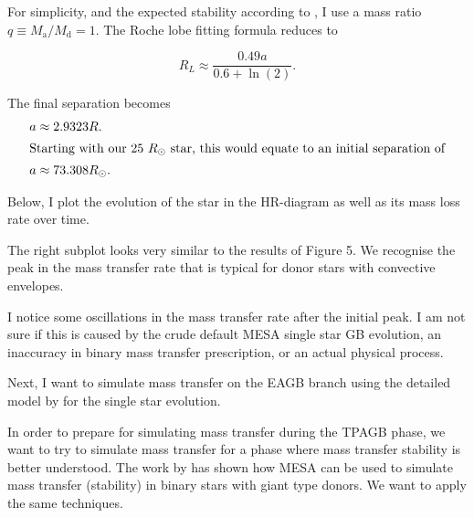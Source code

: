 \documentclass[a4paper,10pt]{article}
\begin{document}
    For simplicity, and the expected stability according to \citet{temmink2022}, I use a mass ratio \(q \equiv M _\text{a} / M _\text{d} = 1\). The Roche lobe fitting formula reduces to
    
    \begin{equation*}
        R_{L} \approx  \frac{0.49 a}{0.6 + \ln (2)}.
    \end{equation*}

    The final separation becomes
    \begin{align}
        a &\approx 2.9323R.\nonumber\\
        \intertext{Starting with our 25 \(R_\odot \) star, this would equate to an initial separation of}
        a &\approx 73.308 R_\odot.\label{eq:a} 
    \end{align}

    Below, I plot the evolution of the star in the HR-diagram as well as its mass loss rate over time.

    \begin{figure}[ht]
        \centering
    \end{figure}

    The right subplot looks very similar to the results of \citet{temmink2022} Figure 5. We recognise the peak in the mass transfer rate that is typical for donor stars with convective envelopes.

    I notice some oscillations in the mass transfer rate after the initial peak. I am not sure if this is caused by the crude default MESA single star GB evolution, an inaccuracy in binary mass transfer prescription, or an actual physical process.

    Next, I want to simulate mass transfer on the EAGB branch using the detailed model by \citet{rees2024b} for the single star evolution.



    In order to prepare for simulating mass transfer during the TPAGB phase, we want to try to simulate mass transfer for a phase where mass transfer stability is better understood. The work by \citet{temmink2022} has shown how MESA can be used to simulate mass transfer (stability) in binary stars with giant type donors. We want to apply the same techniques. 
\end{document}
